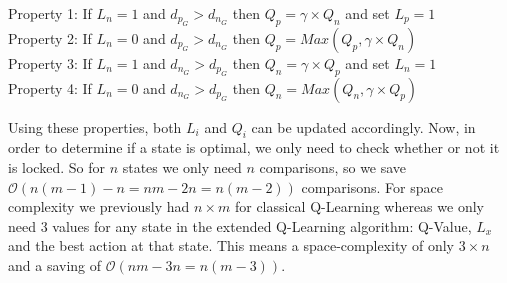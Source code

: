 \vspace{1\baselineskip}\vspace{-\parskip}

\begin{flushleft}
Property 1: If $L_n=1$ and $d_p_G > d_n_G$ then $Q_p = \gamma \times Q_n$ and set $L_p=1$\\
Property 2: If $L_n=0$ and $d_p_G > d_n_G$ then $Q_p = Max(Q_p,\gamma \times Q_n)$\\
Property 3: If $L_n=1$ and $d_n_G > d_p_G$ then $Q_n = \gamma \times Q_p$ and set $L_n=1$\\
Property 4: If $L_n=0$ and $d_n_G > d_p_G$ then $Q_n = Max(Q_n,\gamma \times Q_p)$\\
\end{flushleft}

\vspace{1\baselineskip}\vspace{-\parskip}

Using these properties, both $L_i$ and $Q_i$ can be updated accordingly. Now, in order to determine if a state is optimal, we only need to check whether or not it is locked. So for $n$ states we only need $n$ comparisons, so we save $\mathcal O(n(m-1)-n=nm-2n=n(m-2))$ \cite{11} comparisons.
For space complexity we previously had $n \times m $ for classical Q-Learning whereas we only need $3$ values for any state in the extended Q-Learning algorithm: Q-Value, $L_x$ and the best action at that state. This means a space-complexity of only $3 \times n$ and a saving of $\mathcal O(nm-3n=n(m-3))$.\cite{11}






